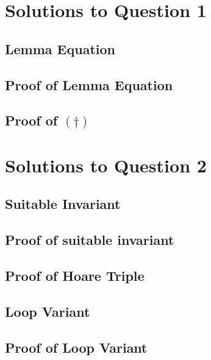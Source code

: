 \documentclass[a4paper,12pt]{article}
\numberwithin{equation}{subsection}
\begin{document}
\section{Solutions to Question 1}
\subsection{Lemma Equation}
% 
\subsection{Proof of Lemma Equation}
% 
\subsection{Proof of \((\dagger)\)}
% 
\section{Solutions to Question 2}
\subsection{Suitable Invariant}
\label{sec:2.1}

\subsection{Proof of suitable invariant}
\label{sec:2.2}

\subsection{Proof of Hoare Triple}
\label{sec:2.3}

\subsection{Loop Variant}
\subsection{Proof of Loop Variant}
\end{document}
